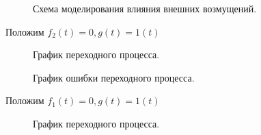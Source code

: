 \documentclass[a4paper, 11pt]{article}
\begin{document}
\begin{figure}[h]
    \caption{Схема моделирования влияния внешних возмущений.}
    \label{tree}
\end{figure}

\normalsize{Положим $f_2(t) = 0, g(t) = 1(t)$}

\begin{figure}[h]
    \caption{График переходного процесса.}
    \label{two}
\end{figure}
\newpage
\begin{figure}[h]
    \caption{График ошибки переходного процесса.}
    \label{tree}
\end{figure}

\normalsize{Положим $f_1(t) = 0, g(t) = 1(t)$}

\begin{figure}[h]
    \caption{График переходного процесса.}
    \label{two}
\end{figure}
    
\end{document}
